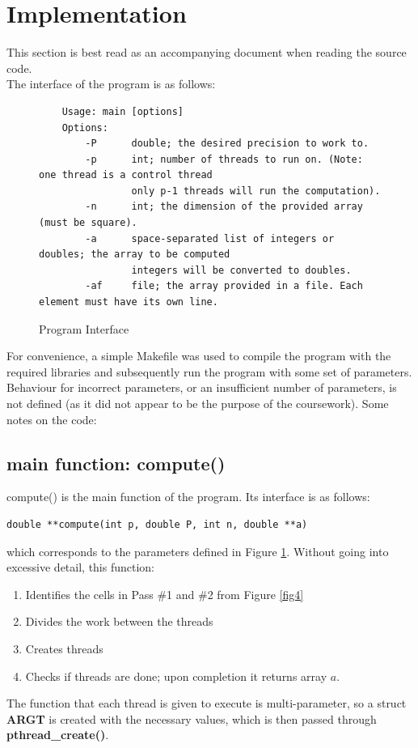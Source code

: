 \documentclass{article}
\begin{document}
\section{Implementation}
This section is best read as an accompanying document when reading the source code.\\\newline
The interface of the program is as follows:
\begin{figure}[H]
    \begin{verbatim}
    Usage: main [options]
    Options: 
        -P      double; the desired precision to work to.
        -p      int; number of threads to run on. (Note: one thread is a control thread
                only p-1 threads will run the computation).
        -n      int; the dimension of the provided array (must be square).
        -a      space-separated list of integers or doubles; the array to be computed
                integers will be converted to doubles.
        -af     file; the array provided in a file. Each element must have its own line.
        \end{verbatim}
        \caption{Program Interface}
        \label{progint}
\end{figure}
For convenience, a simple Makefile was used to compile the program with the required libraries and subsequently run the program with some set of parameters. Behaviour for incorrect parameters, or an insufficient number of parameters, is not defined (as it did not appear to be the purpose of the coursework).
Some notes on the code: 
\subsection{main function: compute()}
compute() is the main function of the program. Its interface is as follows:
\begin{center}
    \begin{verbatim}
double **compute(int p, double P, int n, double **a)
    \end{verbatim}
\end{center}
which corresponds to the parameters defined in Figure \ref{progint}. Without going into excessive detail, this function:
\begin{enumerate}
    \item  Identifies the cells in Pass \#1 and \#2 from Figure \ref{fig4}
    \item   Divides the work between the threads
    \item Creates threads
    \item Checks if threads are done; upon completion it returns array $a$.
\end{enumerate}
The function that each thread is given to execute is multi-parameter, so a struct \textbf{ARGT} is created with the necessary values, which is then passed through \textbf{pthread\_create()}.
\end{document}
